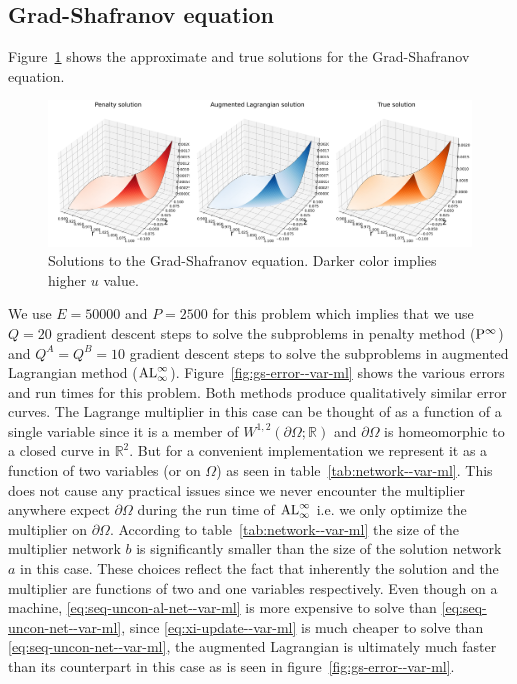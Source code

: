 \subsection{Grad-Shafranov equation}
Figure~\ref{fig:gs-surface--var-ml} shows the approximate and true solutions for the Grad-Shafranov equation.
\begin{figure}[!ht]
    \centering
\includegraphics[scale=0.32]{var-ml/plots/var-plots-Grad-Shafranov-surface.png}
    \caption{Solutions to the Grad-Shafranov equation. Darker color implies higher $u$ value.}
    \label{fig:gs-surface--var-ml}
\end{figure}
We use $E=50000$ and $P=2500$ for this problem which implies that we use $Q=20$ gradient descent steps to solve the subproblems in penalty method (${\rm P}^\infty$) and $Q^A=Q^B=10$ gradient descent steps to solve the subproblems in augmented Lagrangian method (${\rm AL}^\infty_\infty$). Figure~\ref{fig:gs-error--var-ml} shows the various errors and run times for this problem. Both methods produce qualitatively similar error curves. The Lagrange multiplier in this case can be thought of as a function of a single variable since it is a member of $W^{1,2}(\partial\Omega;\mathbb R)$ and $\partial\Omega$ is homeomorphic to a closed curve in $\mathbb R^2$. But for a convenient implementation we represent it as a function of two variables (or on $\Omega$) as seen in table~\ref{tab:network--var-ml}. This does not cause any practical issues since we never encounter the multiplier anywhere expect $\partial \Omega$ during the run time of ${\rm AL}^\infty_\infty$ i.e. we only optimize the multiplier on $\partial\Omega$. According to table~\ref{tab:network--var-ml} the size of the multiplier network $b$ is significantly smaller than the size of the solution network $a$ in this case. These choices reflect the fact that inherently the solution and the multiplier are functions of two and one variables respectively. Even though on a machine, \eqref{eq:seq-uncon-al-net--var-ml} is more expensive to solve than \eqref{eq:seq-uncon-net--var-ml}, since \eqref{eq:xi-update--var-ml} is much cheaper to solve than \eqref{eq:seq-uncon-net--var-ml}, the augmented Lagrangian is ultimately much faster than its counterpart in this case as is seen in figure~\ref{fig:gs-error--var-ml}. 
